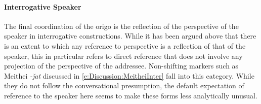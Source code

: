\paragraph{Interrogative Speaker}
The final coordination of the origo is the reflection of the perspective of the speaker in interrogative constructions. While it has been argued above that there is an extent to which any reference to perspective is a reflection of that of the speaker, this in particular refers to direct reference that does not involve any projection of the perspective of the addressee. Non-shifting markers such as Meithei \textit{-ǰat} discussed in \ref{e:Discussion:MeitheiInter} fall into this category. While they do not follow the conversational presumption, the default expectation of reference to the speaker here seems to make these forms less analytically unusual.

